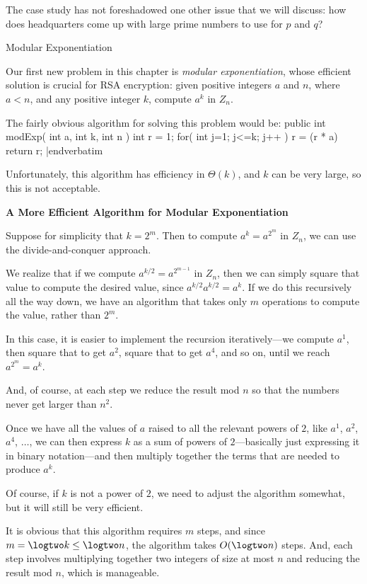The case study has not foreshadowed one other issue that we will discuss:  how does
headquarters come up with large prime numbers to use for $p$ and $q$?
\border

{\bigboldfont Modular Exponentiation}
\medskip

Our first new problem in this chapter is {\it modular exponentiation\/}, whose efficient
solution is crucial for RSA encryption:  given positive
integers $a$ and $n$, where $a<n$, and any positive integer $k$,
compute $a^k$ in $Z_n$.
\medskip

The fairly obvious algorithm for solving this problem would be:
\medskip
\verbatim
public int modExp( int a, int k, int n )
{
  int r = 1;  
  for( int j=1; j<=k; j++ )
    r = (r * a) %
  return r;
}
|endverbatim
\medskip

Unfortunately, this algorithm has efficiency in $\Theta(k)$, and
$k$ can be very large, so this is not acceptable.
\border

{\bf A More Efficient Algorithm for Modular Exponentiation}
\medskip

Suppose for simplicity that $k=2^m$.  Then to compute $a^k = a^{2^m}$ in $Z_n$, we can use
the divide-and-conquer approach.
\medskip

We realize that if we compute $a^{k/2} = a^{2^{m-1}}$ in $Z_n$, then we can simply square that
value to compute the desired value, since $a^{k/2} a^{k/2} = a^k$.  
If we do this recursively all the way down, we have
an algorithm that takes only $m$ operations to compute the value, rather than $2^m$.
\medskip

In this case, it is easier to implement the recursion
iteratively---we compute $a^1$, then square that to get $a^2$,
square that to get $a^4$, and so on, until we reach $a^{2^m} = a^k$.
\medskip

And, of course, at each step we reduce the result mod $n$ so that the
numbers never get larger than $n^2$.
\medskip

Once we have all the values of $a$ raised to all the relevant powers of $2$, like
$a^1$, $a^2$, $a^4$, $\ldots$, we can then express $k$ as a sum of powers of $2$---basically
just expressing it in binary notation---and then multiply together the terms that are needed
to produce $a^k$.
\medskip

Of course, if $k$ is not a power of $2$, we need to adjust the algorithm somewhat, but
it will still be very efficient.
\medskip

It is obvious that this algorithm requires $m$ steps, and since $m = \logtwo k \leq \logtwo n$,
the algorithm takes $O( \logtwo n)$ steps.
And, each step involves multiplying together two integers of size at most $n$
and reducing the result mod $n$, which is manageable.
\medskip


